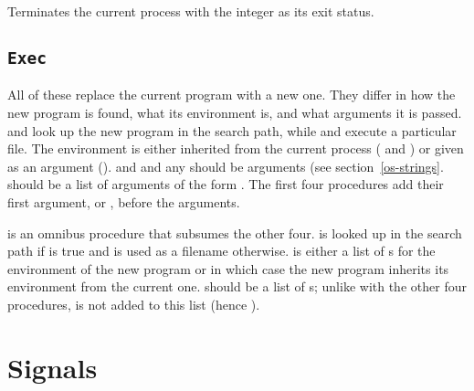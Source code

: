\begin{protos}
\end{protos}
\noindent
Terminates the current process with the integer 
 as its exit status.

\subsection{{\tt Exec}}

\begin{protos}
\end{protos}
\noindent
All of these replace the current program with a new one.
They differ in how the new program is found, what its environment is,
 and what arguments it is passed.
 and 
 look up the new program in the search path,
 while  and 
 execute a particular file.
The environment is either inherited from the current process
 ( and ) or given as an argument
 ().
 and  and any  should
be  arguments (see section~\ref{os-strings}.
  should be a list of  arguments of the form
 .
The first four procedures add their first argument,  or
 , before the  arguments.

 is an omnibus procedure that subsumes the other
 four.
 is looked up in the search path if  is true
 and is used as a filename otherwise.
 is either a list of s for the environment of the
 new program or  in which case the new program inherits its
 environment from the current one.
 should be a list of s; unlike with the other four
 procedures,  is not added to this list (hence ).

\section{Signals}

